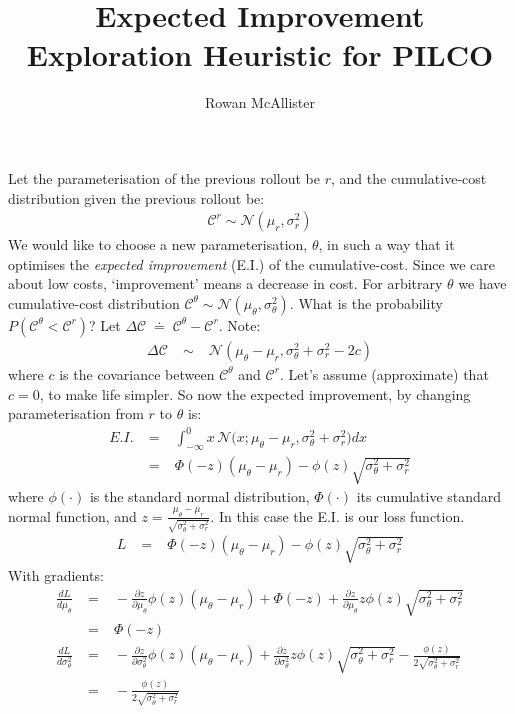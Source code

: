 \documentclass[a4paper,10pt]{article}
\title{Expected Improvement \\ Exploration Heuristic for PILCO}
\author{Rowan McAllister}
\newcommand{\C}{\mathcal{C}}
\begin{document}
\maketitle

Let the parameterisation of the previous rollout be $r$,
and the cumulative-cost distribution given the previous rollout be:
\begin{eqnarray}
 \C^{r} \sim \mathcal{N}(\mu_r,\sigma^2_r)
\end{eqnarray}
%
We would like to choose a new parameterisation, $\theta$, 
in such a way that it optimises the \textit{expected improvement} (E.I.) of the cumulative-cost.
Since we care about low costs, `improvement' means a decrease in cost.
For arbitrary $\theta$ we have cumulative-cost distribution $\C^{\theta} \sim \mathcal{N}(\mu_\theta,\sigma^2_\theta)$. 
What is the probability $P(\C^{\theta} < \C^{r})$? Let $\Delta\C \;\doteq\; \C^{\theta} - \C^{r}$. Note:
\begin{eqnarray}
 \Delta\C \;&\sim&\; \mathcal{N}(\mu_\theta - \mu_r, \sigma^2_\theta + \sigma^2_r - 2c)
\end{eqnarray}
%
where $c$ is the covariance between $\C^{\theta}$ and $\C^{r}$. 
Let's assume (approximate) that $c = 0$, to make life simpler.
So now the expected improvement, by changing parameterisation from $r$ to $\theta$ is:
\begin{eqnarray}
 E.I. 
 \;&=&\; \int_{-\infty}^0 x \, \mathcal{N} \big( x ; \mu_\theta-\mu_r, \sigma^2_\theta + \sigma^2_r \big) dx \\
 \;&=&\; \Phi(-z)(\mu_\theta-\mu_r) - \phi(z)\sqrt{\sigma^2_\theta + \sigma^2_r}
\end{eqnarray} 
where $\phi(\cdot)$ is the standard normal distribution, $\Phi(\cdot)$ its cumulative standard normal function, and
$z = \frac{\mu_\theta-\mu_r}{\sqrt{\sigma^2_\theta + \sigma^2_r}}$.
In this case the E.I. is our loss function.
\begin{eqnarray}
 L \;&=&\; \Phi(-z)(\mu_\theta-\mu_r) - \phi(z)\sqrt{\sigma^2_\theta + \sigma^2_r}
\end{eqnarray}
%
With gradients:
\begin{eqnarray}
 \frac{dL}{d\mu_\theta} 
 \;&=&\; -\frac{\partial z}{\partial \mu_\theta} \phi(z)(\mu_\theta-\mu_r) + \Phi(-z) + \frac{\partial z}{\partial \mu_\theta} z\phi(z)\sqrt{\sigma^2_\theta + \sigma^2_r} \\
 \;&=&\; \Phi(-z) \\
 \frac{dL}{d\sigma^2_\theta}
 \;&=&\;-\frac{\partial z}{\partial \sigma^2_\theta} \phi(z)(\mu_\theta-\mu_r) + \frac{\partial z}{\partial \sigma^2_\theta} z \phi(z)\sqrt{\sigma^2_\theta + \sigma^2_r}
 - \frac{\phi(z)}{2\sqrt{\sigma^2_\theta + \sigma^2_r}} \nonumber \\
 \;&=&\; -\frac{\phi(z)}{2\sqrt{\sigma^2_\theta + \sigma^2_r}}
\end{eqnarray}
\end{document}
